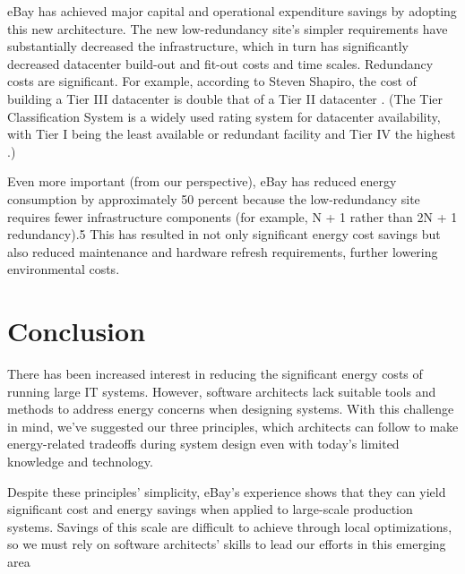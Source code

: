 eBay has achieved major capital and operational expenditure savings by adopting this new architecture. The new low-redundancy site's simpler requirements have substantially decreased the infrastructure, which in turn has significantly decreased datacenter build-out and fit-out costs and time scales. Redundancy costs are significant. For example, according to Steven Shapiro, the cost of building a Tier III datacenter is double that of a Tier II datacenter \cite{shapiro2015-datacentre-mythsrealities}. (The Tier Classification System is a widely used rating system for datacenter availability, with Tier I being the least available or redundant facility and Tier IV the highest \cite{uptime2015-tierclassification}.)

Even more important (from our perspective), eBay has reduced energy consumption by approximately 50 percent because the low-redundancy site requires fewer infrastructure components (for example, N + 1 rather than 2N + 1 redundancy).5 This has resulted in not only significant energy cost savings but also reduced maintenance and hardware refresh requirements, further lowering environmental costs.

\section{Conclusion}

There has been increased interest in reducing the significant energy costs of running large IT systems. However, software architects lack suitable tools and methods to address energy concerns when designing systems. With this challenge in mind, we've suggested our three principles, which architects can follow to make energy-related tradeoffs during system design even with today's limited knowledge and technology.

Despite these principles' simplicity, eBay's experience shows that they can yield significant cost and energy savings when applied to large-scale production systems. Savings of this scale are difficult to achieve through local optimizations, so we must rely on software architects' skills to lead our efforts in this emerging area




